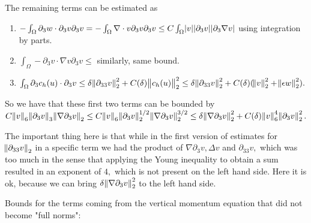 \documentclass[11pt]{article}
\begin{document}
The remaining terms can be estimated as

\begin{enumerate}

\item $- \int_\Omega \partial_3 w \cdot \partial_3 v \partial_3 v = - \int_\Omega \nabla \cdot v \partial_3 v \partial_3 v \leq C \int_\Omega \abs{v} \abs{\partial_3 v} \abs{\partial_3 \nabla v}$ using integration by parts.

\item $\int_\Omega - \partial_3 v \cdot \nabla v \partial_3 v \leq$ similarly, same bound.

\item $\int_\Omega \partial_3 c_h (u) \cdot \partial_3 v \leq \delta \norm{\partial_{33} v}_2^2 + C(\delta) \norm{c_h (u)}_2^2 \leq \delta \norm{\partial_{33} v}_2^2 + C(\delta) (\norm{v}_2^2 + \norm{\epsilon w}_2^2).$

\end{enumerate}

So we have that these first two terms can be bounded by $ C \norm{v}_6 \norm{\partial_3 v}_3 \norm{\nabla \partial_3 v}_2 \leq C \norm{v}_6 \norm{\partial_3 v}_2^{1/2} \norm{\nabla \partial_3 v}_2^{3/2} \leq \delta \norm{\nabla \partial_3 v}_2^2 + C(\delta) \norm{v}_6^4 \norm{\partial_3 v}_2^2.$

The important thing here is that while in the first version of estimates for $\norm{\partial_{33} v}_2$ in a specific term we had the product of $\nabla \partial_3 v, \Delta v$ and $\partial_{33} v,$ which was too much in the sense that applying the Young inequality to obtain a sum resulted in an exponent of $4,$ which is not present on the left hand side. Here it is ok, because we can bring $\delta \norm{\nabla \partial_3 v}_2^2$ to the left hand side.

Bounds for the terms coming from the vertical momentum equation that did not become "full norms":
\end{document}
